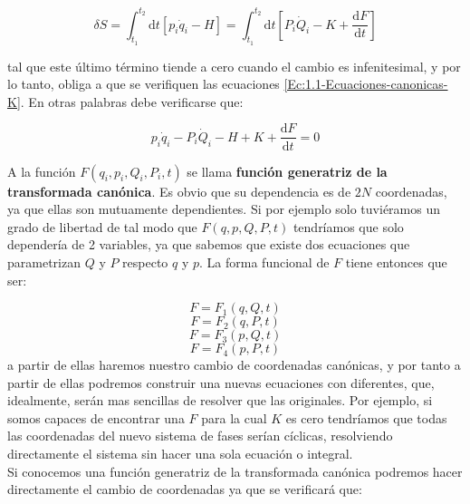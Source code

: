 \documentclass[12pt,a4paper]{article}
\numberwithin{equation}{section}
\numberwithin{figure}{section}
\newcommand{\ccorchetes}[1]{\left[ #1  \right]}
\newcommand{\D}{\mathrm{d}}
\begin{document}
\begin{equation}
\delta S = \int_{t_1}^{t_2} \D t \ccorchetes{p_i \dot{q}_i - H} = \int_{t_1}^{t_2} \D t \ccorchetes{P_i \dot{Q}_i - K + \dfrac{\D F}{\D t}} 
\end{equation}

tal que este último término tiende a cero cuando el cambio es infenitesimal, y por lo tanto, obliga a que se verifiquen las ecuaciones \ref{Ec:1.1-Ecuaciones-canonicas-K}. En otras palabras debe verificarse que:

\begin{equation}
p_i \dot{q}_i - P_i \dot{Q}_i - H + K + \dfrac{\D F}{\D t} = 0 \label{Ec:1.1-K-H2}
\end{equation}


 A la función $F(q_i,p_i,Q_i,P_i,t)$ se llama \textbf{función generatriz de la transformada canónica}. Es obvio que su dependencia es de $2N$ coordenadas, ya que ellas  son mutuamente dependientes. Si por ejemplo solo tuviéramos un grado de libertad de tal modo que $F(q,p,Q,P,t)$ tendríamos que solo dependería de 2 variables, ya que sabemos que existe dos ecuaciones que parametrizan $Q$ y $P$ respecto $q$ y $p$. La forma funcional de $F$ tiene entonces que ser:

\begin{equation}
F = F_1 (q,Q,t)
\end{equation}
\begin{equation}
F = F_2 (q,P,t)
\end{equation}
\begin{equation}
F = F_3 (p,Q,t)
\end{equation}
\begin{equation}
F = F_4 (p,P,t)
\end{equation}
a partir de ellas haremos nuestro cambio de coordenadas canónicas, y por tanto a partir de ellas podremos construir una nuevas ecuaciones con diferentes, que, idealmente, serán mas sencillas de resolver que las originales. Por ejemplo, si somos capaces de encontrar una $F$ para la cual $K$ es cero tendríamos que todas las coordenadas del nuevo sistema de fases serían cíclicas, resolviendo directamente el sistema sin hacer una sola ecuación o integral. \\

Si conocemos una función generatriz de la transformada canónica podremos hacer directamente el cambio de coordenadas ya que se verificará que:
 
\end{document}
